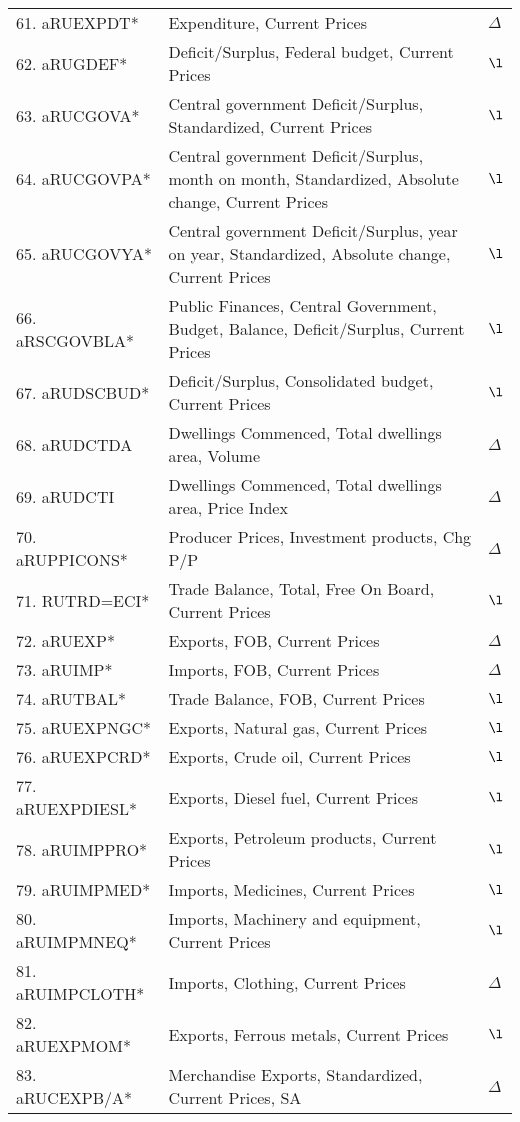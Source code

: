 \documentclass[a4paper, 14pt]{article}
\begin{document}
\begin{center}
\begin{longtable}{p{5.5cm} p{10cm} p{0.15cm}}
	61. aRUEXPDT* &  Expenditure, Current Prices & $\Delta$\\
	62. aRUGDEF* &  Deficit/Surplus, Federal budget, Current Prices & $\l$\\
	63. aRUCGOVA* &  Central government Deficit/Surplus, Standardized, Current Prices & $\l$\\
	64. aRUCGOVPA* &  Central government Deficit/Surplus, month on month, Standardized, Absolute change, Current Prices & $\l$\\
	65. aRUCGOVYA* &  Central government Deficit/Surplus, year on year, Standardized, Absolute change, Current Prices & $\l$\\
	66. aRSCGOVBLA* &  Public Finances, Central Government, Budget, Balance, Deficit/Surplus, Current Prices & $\l$\\
	67. aRUDSCBUD* &  Deficit/Surplus, Consolidated budget, Current Prices & $\l$\\
	68. aRUDCTDA &  Dwellings Commenced, Total dwellings area, Volume & $\Delta$\\
	69. aRUDCTI &  Dwellings Commenced, Total dwellings area, Price Index & $\Delta$\\
	70. aRUPPICONS* &  Producer Prices, Investment products, Chg P/P & $\Delta$\\
	71. RUTRD=ECI* &  Trade Balance, Total, Free On Board, Current Prices & $\l$\\
	72. aRUEXP* &  Exports, FOB, Current Prices & $\Delta$\\
	73. aRUIMP* &  Imports, FOB, Current Prices & $\Delta$\\
	74. aRUTBAL* &  Trade Balance, FOB, Current Prices & $\l$\\
	75. aRUEXPNGC* &  Exports, Natural gas, Current Prices & $\l$\\
	76. aRUEXPCRD* &  Exports, Crude oil, Current Prices & $\l$\\
	77. aRUEXPDIESL* &  Exports, Diesel fuel, Current Prices & $\l$\\
	78. aRUIMPPRO* &  Exports, Petroleum products, Current Prices & $\l$\\
	79. aRUIMPMED* &  Imports, Medicines, Current Prices & $\l$\\
	80. aRUIMPMNEQ* &  Imports, Machinery and equipment, Current Prices & $\l$\\
	81. aRUIMPCLOTH* &  Imports, Clothing, Current Prices & $\Delta$\\
	82. aRUEXPMOM* &  Exports, Ferrous metals, Current Prices & $\l$\\
	83. aRUCEXPB/A* &  Merchandise Exports, Standardized, Current Prices, SA & $\Delta$\\

\end{longtable}
\end{center}
\end{document}
